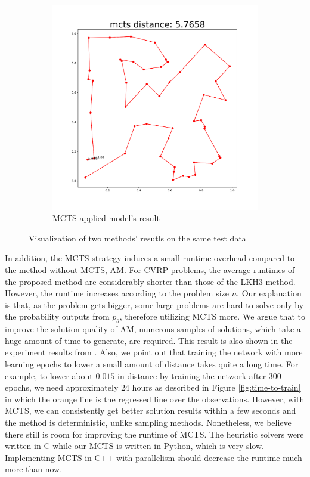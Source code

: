 \documentclass{article}
\begin{document}
\begin{figure}
\begin{center}
\begin{subfigure}[b]{0.49\linewidth}
             \includegraphics[width=\linewidth]{figures/MCTS result.png}
             \caption{MCTS applied model's result}
             \label{fig:MCTS-result}
        \end{subfigure}
    \end{center}
    \caption{Visualization of two methods' resutls on the same test data}
    \label{fig:visualized result}
\end{figure}

In addition, the MCTS strategy induces a small runtime overhead compared to the method without MCTS, AM. For CVRP problems, the average runtimes of the proposed method are considerably shorter than those of the LKH3 method. However, the runtime increases according to the problem size $n$. Our explanation is that, as the problem gets bigger, some large problems are hard to solve only by the probability outputs from $p_\theta$, therefore utilizing MCTS more. We argue that to improve the solution quality of AM, numerous samples of solutions, which take a huge amount of time to generate, are required. This result is also shown in the experiment results from \cite{kwonPOMOPolicyOptimization2021}. Also, we point out that training the network with more learning epochs to lower a small amount of distance takes quite a long time. For example, to lower about $0.015$ in distance by training the network after $300$ epochs, we need approximately $24$ hours as described in Figure \ref{fig:time-to-train} in which the orange line is the regressed line over the observations. However, with MCTS, we can consistently get better solution results within a few seconds and the method is deterministic, unlike sampling methods. Nonetheless, we believe there still is room for improving the runtime of MCTS. The heuristic solvers were written in C while our MCTS is written in Python, which is very slow. Implementing MCTS in C++ with parallelism should decrease the runtime much more than now.
\end{document}
